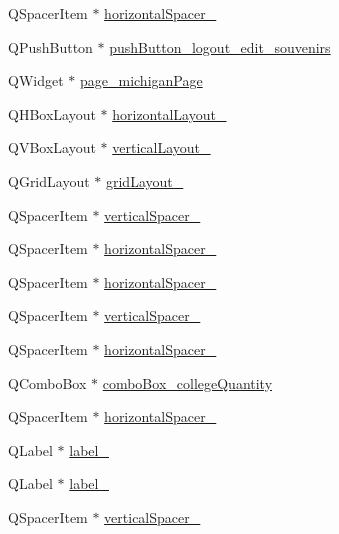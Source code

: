 \begin{DoxyCompactItemize}
\item 
Q\+Spacer\+Item $\ast$ \hyperlink{class_ui___main_window_a4ec27019ef46c9db63c53f0495beff56}{horizontal\+Spacer\+\_}
\item 
Q\+Push\+Button $\ast$ \hyperlink{class_ui___main_window_a8214beca25ea03e9334aaa3679231dab}{push\+Button\+\_\+logout\+\_\+edit\+\_\+souvenirs}
\item 
Q\+Widget $\ast$ \hyperlink{class_ui___main_window_adfcf3eb7e5916d09f510d9c617ab5c23}{page\+\_\+michigan\+Page}
\item 
Q\+H\+Box\+Layout $\ast$ \hyperlink{class_ui___main_window_a49a16c34d46bb0d66edb10c3b92b226c}{horizontal\+Layout\+\_}
\item 
Q\+V\+Box\+Layout $\ast$ \hyperlink{class_ui___main_window_a04ce3ef61cc4b4fb628b2a258275f5ef}{vertical\+Layout\+\_}
\item 
Q\+Grid\+Layout $\ast$ \hyperlink{class_ui___main_window_a1482572d55e80324ebb4a9e53c0120e3}{grid\+Layout\+\_}
\item 
Q\+Spacer\+Item $\ast$ \hyperlink{class_ui___main_window_a9d5e3dc109715173ad67461b121c2b79}{vertical\+Spacer\+\_}
\item 
Q\+Spacer\+Item $\ast$ \hyperlink{class_ui___main_window_a851bbc49a589eb9bdf5fa175bf4cbcad}{horizontal\+Spacer\+\_}
\item 
Q\+Spacer\+Item $\ast$ \hyperlink{class_ui___main_window_a1cfcc11f730f1d06705337aae2ce7b75}{horizontal\+Spacer\+\_}
\item 
Q\+Spacer\+Item $\ast$ \hyperlink{class_ui___main_window_ac554123dda4b7f53eaf995feecef2aa1}{vertical\+Spacer\+\_}
\item 
Q\+Spacer\+Item $\ast$ \hyperlink{class_ui___main_window_a0269550065cc414e7ad7745049968540}{horizontal\+Spacer\+\_}
\item 
Q\+Combo\+Box $\ast$ \hyperlink{class_ui___main_window_a58b76890eafb9c6006625ba6d447ac78}{combo\+Box\+\_\+college\+Quantity}
\item 
Q\+Spacer\+Item $\ast$ \hyperlink{class_ui___main_window_a9475ee59a6a4a878f3459613ce894eb9}{horizontal\+Spacer\+\_}
\item 
Q\+Label $\ast$ \hyperlink{class_ui___main_window_aa7d5a218f527f204fa7f544dc8c024a7}{label\+\_}
\item 
Q\+Label $\ast$ \hyperlink{class_ui___main_window_a7a9350c6de61e7051850744487d910bd}{label\+\_}
\item 
Q\+Spacer\+Item $\ast$ \hyperlink{class_ui___main_window_a1d23e45ccda45e5c92e100ef6a9d8b00}{vertical\+Spacer\+\_}

\end{DoxyCompactItemize}
